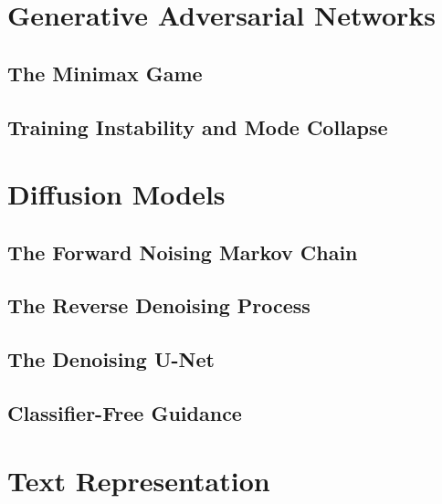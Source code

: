 \section{Generative Adversarial Networks}
\label{sec:gan}

\subsection{The Minimax Game}


\subsection{Training Instability and Mode Collapse}

\section{Diffusion Models}
\label{sec:diffusion}

\subsection{The Forward Noising Markov Chain}


\subsection{The Reverse Denoising Process}

\subsection{The Denoising U-Net}

\subsection{Classifier-Free Guidance}

\section{Text Representation}
\label{sec:text-representation}

